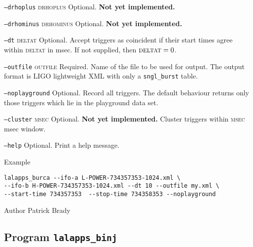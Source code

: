 \begin{entry}
\begin{entry}
\item[\texttt{--drhoplus} \textsc{drhoplus}] Optional.  \textbf{Not yet
implemented.}

\item[\texttt{--drhominus} \textsc{drhominus}] Optional. \textbf{Not yet
implemented.}

\item[\texttt{--dt} \textsc{deltat}] Optional. Accept triggers as coincident if
their start times agree within \textsc{deltat} in msec.  If not supplied,  then 
$\textsc{deltat} = 0$.

\item[\texttt{--outfile} \textsc{outfile}] Required.  Name of the file
to be used for output.  The output format is LIGO lightweight XML with
only a \texttt{sngl\_burst} table.

\item[\texttt{--noplayground}] Optional.  Record all triggers.  The
default behaviour returns only those triggers which lie in the
playground data set.  

\item[\texttt{--cluster} \textsc{msec}] Optional.  \textbf{Not yet
implemented.}  Cluster triggers within \textsc{msec} msec window.

\item[\texttt{--help}] Optional.  Print a help message.
\end{entry}

\item[Example]
\begin{verbatim}
lalapps_burca --ifo-a L-POWER-734357353-1024.xml \
--ifo-b H-POWER-734357353-1024.xml --dt 10 --outfile my.xml \
--start-time 734357353  --stop-time 734358353 --noplayground
\end{verbatim}
\item[Author] 
Patrick Brady
\end{entry}
\clearpage

\subsection{Program \texttt{lalapps\_binj}}
\label{program:lalapps-binj}
\idx[Program]{lalapps\_binj}

